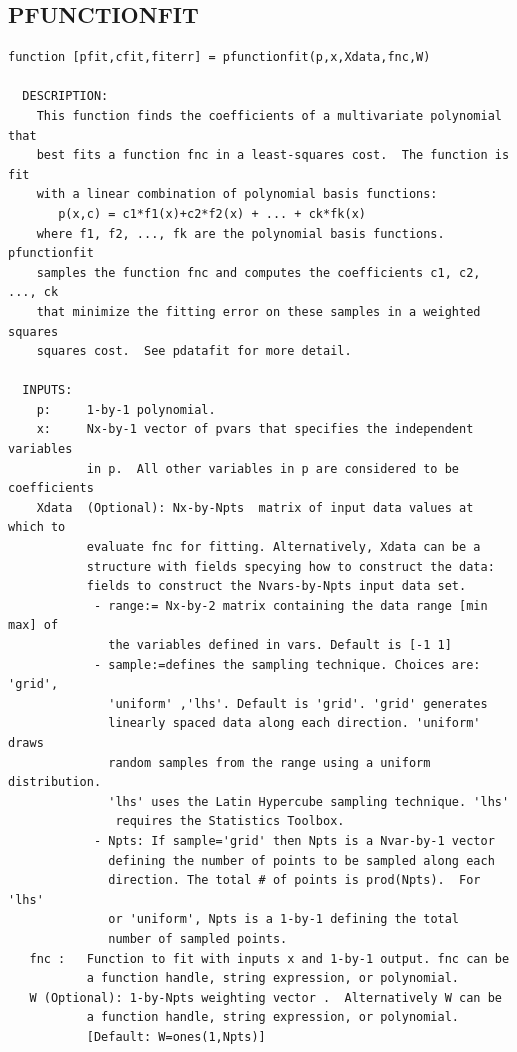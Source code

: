 \documentclass{article}
\begin{document}
\subsection{PFUNCTIONFIT}
\begin{verbatim}
function [pfit,cfit,fiterr] = pfunctionfit(p,x,Xdata,fnc,W)

  DESCRIPTION:
    This function finds the coefficients of a multivariate polynomial that
    best fits a function fnc in a least-squares cost.  The function is fit
    with a linear combination of polynomial basis functions:
       p(x,c) = c1*f1(x)+c2*f2(x) + ... + ck*fk(x)
    where f1, f2, ..., fk are the polynomial basis functions. pfunctionfit
    samples the function fnc and computes the coefficients c1, c2, ..., ck
    that minimize the fitting error on these samples in a weighted squares
    squares cost.  See pdatafit for more detail.

  INPUTS:
    p:     1-by-1 polynomial.
    x:     Nx-by-1 vector of pvars that specifies the independent variables
           in p.  All other variables in p are considered to be coefficients
    Xdata  (Optional): Nx-by-Npts  matrix of input data values at which to
           evaluate fnc for fitting. Alternatively, Xdata can be a
           structure with fields specying how to construct the data:
           fields to construct the Nvars-by-Npts input data set.
            - range:= Nx-by-2 matrix containing the data range [min max] of
              the variables defined in vars. Default is [-1 1]
            - sample:=defines the sampling technique. Choices are: 'grid',
              'uniform' ,'lhs'. Default is 'grid'. 'grid' generates
              linearly spaced data along each direction. 'uniform' draws
              random samples from the range using a uniform distribution.
              'lhs' uses the Latin Hypercube sampling technique. 'lhs'
               requires the Statistics Toolbox.
            - Npts: If sample='grid' then Npts is a Nvar-by-1 vector
              defining the number of points to be sampled along each
              direction. The total # of points is prod(Npts).  For 'lhs'
              or 'uniform', Npts is a 1-by-1 defining the total
              number of sampled points.
   fnc :   Function to fit with inputs x and 1-by-1 output. fnc can be
           a function handle, string expression, or polynomial.
   W (Optional): 1-by-Npts weighting vector .  Alternatively W can be
           a function handle, string expression, or polynomial.
           [Default: W=ones(1,Npts)]


\end{verbatim}
\end{document}
